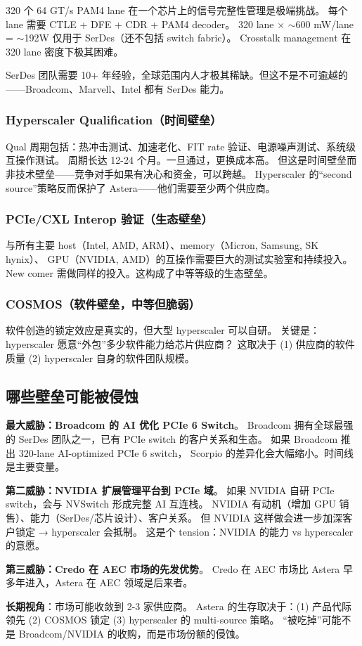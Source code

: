 320 个 64 GT/s PAM4 lane 在一个芯片上的信号完整性管理是极端挑战。
每个 lane 需要 CTLE + DFE + CDR + PAM4 decoder。
320 lane $\times$ $\sim$600 mW/lane = $\sim$192W 仅用于 SerDes（还不包括 switch fabric）。
Crosstalk management 在 320 lane 密度下极其困难。

SerDes 团队需要 10+ 年经验，全球范围内人才极其稀缺。但这不是不可逾越的——Broadcom、Marvell、Intel 都有 SerDes 能力。

\subsubsection{Hyperscaler Qualification（时间壁垒）}

Qual 周期包括：热冲击测试、加速老化、FIT rate 验证、电源噪声测试、系统级互操作测试。
周期长达 12-24 个月。一旦通过，更换成本高。
但这是时间壁垒而非技术壁垒——竞争对手如果有决心和资金，可以跨越。
Hyperscaler 的``second source''策略反而保护了 Astera——他们需要至少两个供应商。

\subsubsection{PCIe/CXL Interop 验证（生态壁垒）}

与所有主要 host（Intel, AMD, ARM）、memory（Micron, Samsung, SK hynix）、
GPU（NVIDIA, AMD）的互操作需要巨大的测试实验室和持续投入。
New comer 需做同样的投入。这构成了中等等级的生态壁垒。

\subsubsection{COSMOS（软件壁垒，中等但脆弱）}

软件创造的锁定效应是真实的，但大型 hyperscaler 可以自研。
关键是：hyperscaler 愿意``外包''多少软件能力给芯片供应商？
这取决于 (1) 供应商的软件质量 (2) hyperscaler 自身的软件团队规模。

\subsection{哪些壁垒可能被侵蚀}

\textbf{最大威胁：Broadcom 的 AI 优化 PCIe 6 Switch}。
Broadcom 拥有全球最强的 SerDes 团队之一，已有 PCIe switch 的客户关系和生态。
如果 Broadcom 推出 320-lane AI-optimized PCIe 6 switch，
Scorpio 的差异化会大幅缩小。时间线是主要变量。

\textbf{第二威胁：NVIDIA 扩展管理平台到 PCIe 域}。
如果 NVIDIA 自研 PCIe switch，会与 NVSwitch 形成完整 AI 互连栈。
NVIDIA 有动机（增加 GPU 销售）、能力（SerDes/芯片设计）、客户关系。
但 NVIDIA 这样做会进一步加深客户锁定 → hyperscaler 会抵制。
这是个 tension：NVIDIA 的能力 vs hyperscaler 的意愿。

\textbf{第三威胁：Credo 在 AEC 市场的先发优势}。
Credo 在 AEC 市场比 Astera 早多年进入，Astera 在 AEC 领域是后来者。

\textbf{长期视角}：市场可能收敛到 2-3 家供应商。
Astera 的生存取决于：(1) 产品代际领先 (2) COSMOS 锁定 (3) hyperscaler 的 multi-source 策略。
``被吃掉''可能不是 Broadcom/NVIDIA 的收购，而是市场份额的侵蚀。
